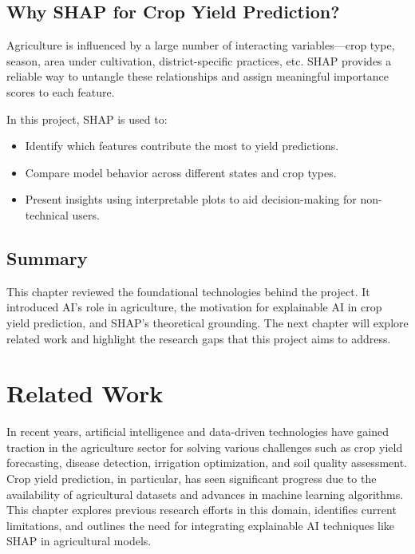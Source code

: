 \documentclass[a4paper,11pt,oneside]{book}
\begin{document}
\section{Why SHAP for Crop Yield Prediction?}

Agriculture is influenced by a large number of interacting variables—crop type, season, area under cultivation, district-specific practices, etc. SHAP provides a reliable way to untangle these relationships and assign meaningful importance scores to each feature.

In this project, SHAP is used to:
\begin{itemize}
    \item Identify which features contribute the most to yield predictions.
    \item Compare model behavior across different states and crop types.
    \item Present insights using interpretable plots to aid decision-making for non-technical users.
\end{itemize}

\section{Summary}

This chapter reviewed the foundational technologies behind the project. It introduced AI’s role in agriculture, the motivation for explainable AI in crop yield prediction, and SHAP’s theoretical grounding. The next chapter will explore related work and highlight the research gaps that this project aims to address.

\newpage


\chapter{Related Work}

In recent years, artificial intelligence and data-driven technologies have gained traction in the agriculture sector for solving various challenges such as crop yield forecasting, disease detection, irrigation optimization, and soil quality assessment. Crop yield prediction, in particular, has seen significant progress due to the availability of agricultural datasets and advances in machine learning algorithms. This chapter explores previous research efforts in this domain, identifies current limitations, and outlines the need for integrating explainable AI techniques like SHAP in agricultural models.
\end{document}
